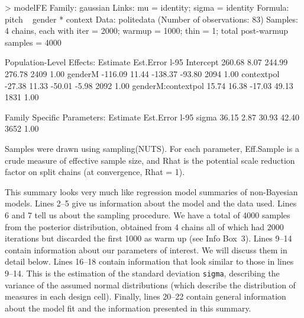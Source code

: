 \documentclass[nobib]{tufte-handout}
\begin{document}
\begin{minipage}[]{1.2\textwidth}
\begin{rc}
> modelFE
 Family: gaussian 
  Links: mu = identity; sigma = identity 
Formula: pitch ~ gender * context 
   Data: politedata (Number of observations: 83) 
Samples: 4 chains, each with iter = 2000; warmup = 1000; thin = 1;
         total post-warmup samples = 4000

Population-Level Effects: 
                   Estimate Est.Error l-95%
Intercept            260.68      8.07   244.99   276.78       2409 1.00
genderM             -116.09     11.44  -138.37   -93.80       2094 1.00
contextpol           -27.38     11.33   -50.01    -5.98       2092 1.00
genderM:contextpol    15.74     16.38   -17.03    49.13       1831 1.00

Family Specific Parameters: 
      Estimate Est.Error l-95%
sigma    36.15      2.87    30.93    42.40       3652 1.00

Samples were drawn using sampling(NUTS). For each parameter, Eff.Sample 
is a crude measure of effective sample size, and Rhat is the potential 
scale reduction factor on split chains (at convergence, Rhat = 1).
\end{rc}
\end{minipage}

This summary looks very much like regression model summaries of non-Bayesian models. Lines 2--5
give us information about the model and the data used. Lines 6 and 7 tell us about the sampling
procedure. We have a total of 4000 samples from the posterior distribution, obtained from 4
chains all of which had 2000 iterations but discarded the first 1000 as warm up (see Info Box~3). Lines 9--14 contain information about our parameters of interest. We will discuss them in detail below. Lines 16--18 contain information that look similar to those in lines 9--14. This is the estimation of the standard deviation \texttt{sigma}, describing the variance of the assumed normal distributions (which describe the distribution of measures in each design cell). Finally, lines 20--22 contain general information about the model fit and the information presented in this summary.
\end{document}
